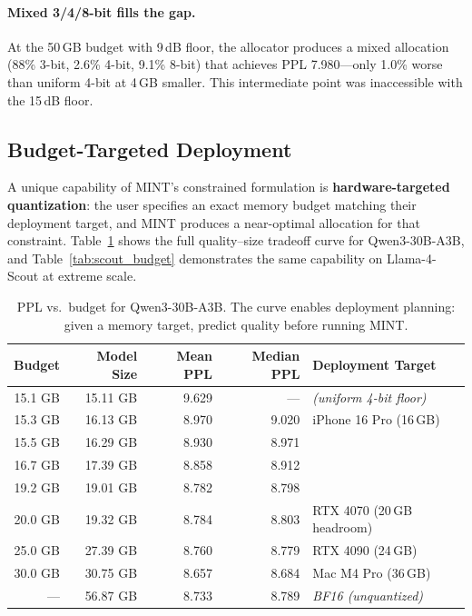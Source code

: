 \documentclass{article}
\begin{document}
\paragraph{Mixed 3/4/8-bit fills the gap.} At the 50\,GB budget with 9\,dB floor, the allocator produces a mixed allocation (88\% 3-bit, 2.6\% 4-bit, 9.1\% 8-bit) that achieves PPL 7.980---only 1.0\% worse than uniform 4-bit at 4\,GB smaller. This intermediate point was inaccessible with the 15\,dB floor.

\subsection{Budget-Targeted Deployment}
\label{sec:budget_targeting}

A unique capability of MINT's constrained formulation is \textbf{hardware-targeted quantization}: the user specifies an exact memory budget matching their deployment target, and MINT produces a near-optimal allocation for that constraint. Table~\ref{tab:budget_curve} shows the full quality--size tradeoff curve for Qwen3-30B-A3B, and Table~\ref{tab:scout_budget} demonstrates the same capability on Llama-4-Scout at extreme scale.

\begin{table}[h]
\centering
\caption{PPL vs.\ budget for Qwen3-30B-A3B. The curve enables deployment planning: given a memory target, predict quality before running MINT.}
\label{tab:budget_curve}
\begin{tabular}{rrrrl}
\toprule
Budget & Model Size & Mean PPL & Median PPL & Deployment Target \\
\midrule
15.1 GB & 15.11 GB & 9.629 & --- & \emph{(uniform 4-bit floor)} \\
15.3 GB & 16.13 GB & 8.970 & 9.020 & iPhone 16 Pro (16\,GB) \\
15.5 GB & 16.29 GB & 8.930 & 8.971 & \\
16.7 GB & 17.39 GB & 8.858 & 8.912 & \\
19.2 GB & 19.01 GB & 8.782 & 8.798 & \\
20.0 GB & 19.32 GB & 8.784 & 8.803 & RTX 4070 (20\,GB headroom) \\
25.0 GB & 27.39 GB & 8.760 & 8.779 & RTX 4090 (24\,GB) \\
30.0 GB & 30.75 GB & 8.657 & 8.684 & Mac M4 Pro (36\,GB) \\
--- & 56.87 GB & 8.733 & 8.789 & \emph{BF16 (unquantized)} \\
\bottomrule
\end{tabular}
\end{table}
\end{document}
